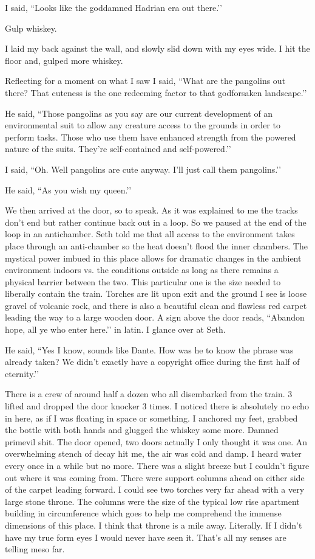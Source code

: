 I said, ``Looks like the goddamned Hadrian era out there.’’

Gulp whiskey.

I laid my back against the wall, and slowly slid down with my eyes wide. I hit the floor and, gulped more whiskey.

Reflecting for a moment on what I saw I said, ``What are the pangolins out there? That cuteness is the one redeeming factor to that godforsaken landscape.’’

He said, ``Those pangolins as you say are our current development of an environmental suit to allow any creature access to the grounds in order to perform tasks. Those who use them have enhanced strength from the powered nature of the suits. They’re self-contained and self-powered.’’

I said, ``Oh. Well pangolins are cute anyway. I’ll just call them pangolins.’’

He said, ``As you wish my queen.’’

We then arrived at the door, so to speak. As it was explained to me the tracks don’t end but rather continue back out in a loop. So we paused at the end of the loop in an antichamber. Seth told me that all access to the environment takes place through an anti-chamber so the heat doesn’t flood the inner chambers. The mystical power imbued in this place allows for dramatic changes in the ambient environment indoors vs. the conditions outside as long as there remains a physical barrier between the two. This particular one is the size needed to liberally contain the train. Torches are lit upon exit and the ground I see is loose gravel of volcanic rock, and there is also a beautiful clean and flawless red carpet leading the way to a large wooden door. A sign above the door reads, ``Abandon hope, all ye who enter here.’’ in latin. I glance over at Seth.

He said, ``Yes I know, sounds like Dante. How was he to know the phrase was already taken? We didn’t exactly have a copyright office during the first half of eternity.’’

There is a crew of around half a dozen who all disembarked from the train. 3 lifted and dropped the door knocker 3 times. I noticed there is absolutely no echo in here, as if I was floating in space or something. I anchored my feet, grabbed the bottle with both hands and glugged the whiskey some more. Damned primevil shit. The door opened, two doors actually I only thought it was one. An overwhelming stench of decay hit me, the air was cold and damp. I heard water every once in a while but no more. There was a slight breeze but I couldn’t figure out where it was coming from. There were support columns ahead on either side of the carpet leading forward. I could see two torches very far ahead with a very large stone throne. The columns were the size of the typical low rise apartment building in circumference which goes to help me comprehend the immense dimensions of this place. I think that throne is a mile away. Literally. If I didn’t have my true form eyes I would never have seen it. That’s all my senses are telling meso far.

